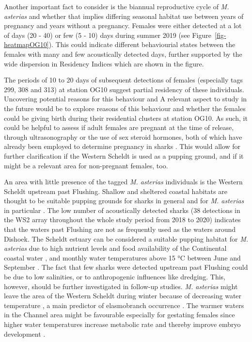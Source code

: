 \documentclass[
  authoryear,
  review,
  3p]{elsarticle}
\begin{document}
Another important fact to consider is the biannual reproductive cycle of
\emph{M. asterias} and whether that implies differing seasonal habitat
use between years of pregnancy and years without a pregnancy. Females
were either detected at a lot of days (20 - 40) or few (5 - 10) days
during summer 2019 (see Figure~\ref{fig-heatmapOG10}). This could
indicate different behaviourial states between the females with many and
few acoustically detected days, further supported by the wide dispersion
in Residency Indices which are shown in the figure.

The periods of 10 to 20 days of subsequent detections of females
(especially tags 299, 308 and 313) at station OG10 suggest partial
residency of these individuals. Uncovering potential reasons for this
behaviour and A relevant aspect to study in the future would be to
explore reasons of this behaviour and whether the females could be
giving birth during their residential clusters at station OG10. As such,
it could be helpful to assess if adult females are pregnant at the time
of release, through ultrasonography or the use of sex steroid hormones,
both of which have already been employed to determine pregnancy in
sharks
\citep{awruch_2014, smukall_2019, anderson_2018, fujinami_2020, fujinami_2021}.
This would allow for further clarification if the Western Scheldt is
used as a pupping ground, and if it might be a relevant area for
non-pregnant females, too.

An area with little presence of the tagged \emph{M. asterias}
individuals is the Western Scheldt upstream past Flushing. Shallow and
sheltered coastal habitats are thought to be suitable pupping grounds
for sharks in general \citep{speed_2010} and for \emph{M. asterias} in
particular \citep{ellis_2004, ellis_2005}. The low number of
acoustically detected sharks (38 detections in the WS2 array throughout
the whole study period from 2018 to 2020) indicates that the waters past
Flushing are not as frequently used as the waters around Dishoek. The
Scheldt estuary can be considered a suitable pupping habitat for
\emph{M. asterias} due to high nutrient levels and food availability of
the Continental coastal water \citep[which enters the estuary through
tidal currents,][]{wolff_1973}, and monthly water temperatures above 15
°C between June and September \citep{speed_2010}. The fact that few
sharks were detected upstream past Flushing could be due to low
salinities, or to anthropogenic influences like dredging. This, however,
should be further investigated in follow-up studies. \emph{M. asterias}
might leave the area of the Western Scheldt during winter because of
decreasing water temperature \citep{breve_2016}, a main predictor of
elasmobranch occurrence \citep{martin_2010}. The warmer waters in the
Channel area might be favourable especially for gestating females since
higher water temperatures increase metabolic rate and thereby improve
embryo development \citep{hurst_1999}.
\end{document}
